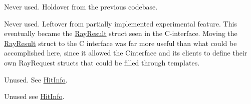\begin{DoxyRefList}
%
Never used. Holdover from the previous codebase.  
\item[Class \mbox{\hyperlink{a00175}{HF\+::Ray\+Tracer\+::Hit\+Info}} ]\label{a00161__deprecated000016}%
%
Never used. Leftover from partially implemented experimental feature. This eventually became the \mbox{\hyperlink{a01117}{Ray\+Result}} struct seen in the C-\/interface. Moving the \mbox{\hyperlink{a01117}{Ray\+Result}} struct to the C interface was far more useful than what could be accomplished here, since it allowed the Cinterface and its clients to define their own Ray\+Request structs that could be filled through templates.  
\item[Class \mbox{\hyperlink{a01073}{HF\+::Ray\+Tracer\+::Ray\+Request\+Lite}} ]\label{a00161__deprecated000017}%
%
Unused. See \mbox{\hyperlink{a00175_a01069}{Hit\+Info}}.  
\item[Class \mbox{\hyperlink{a01077}{HF\+::Ray\+Tracer\+::Ray\+Request\+Collection}} ]\label{a00161__deprecated000018}%
%
Unused see \mbox{\hyperlink{a00175_a01069}{Hit\+Info}}. 
\end{DoxyRefList}